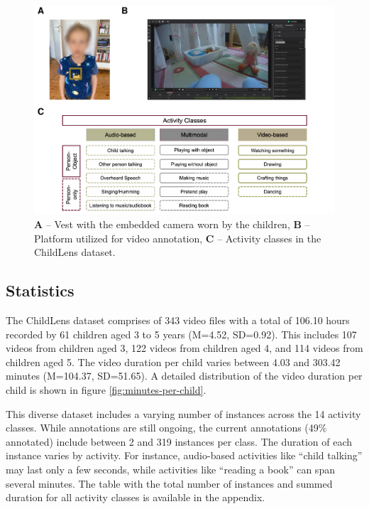 \documentclass[
  man,floatsintext]{apa6}
\begin{document}
\begin{figure}

{\centering \includegraphics{ChildLens_paper_files/figure-latex/camera-superannotate-activity-classes-1} 

}

\caption{\textbf{A} – Vest with the embedded camera worn by the children, \textbf{B} – Platform utilized for video annotation, \textbf{C} – Activity classes in the ChildLens dataset.}\label{fig:camera-superannotate-activity-classes}
\end{figure}

\subsection{Statistics}\label{statistics}

The ChildLens dataset comprises of 343 video files with a total of 106.10 hours recorded by 61 children aged 3 to 5 years (M=4.52, SD=0.92). This includes 107 videos from children aged 3, 122 videos from children aged 4, and 114 videos from children aged 5. The video duration per child varies between 4.03 and 303.42 minutes (M=104.37, SD=51.65). A detailed distribution of the video duration per child is shown in figure \ref{fig:minutes-per-child}.

This diverse dataset includes a varying number of instances across the 14 activity classes. While annotations are still ongoing, the current annotations (49\% annotated) include between 2 and 319 instances per class. The duration of each instance varies by activity. For instance, audio-based activities like ``child talking'' may last only a few seconds, while activities like ``reading a book'' can span several minutes. The table with the total number of instances and summed duration for all activity classes is available in the appendix.
\end{document}
